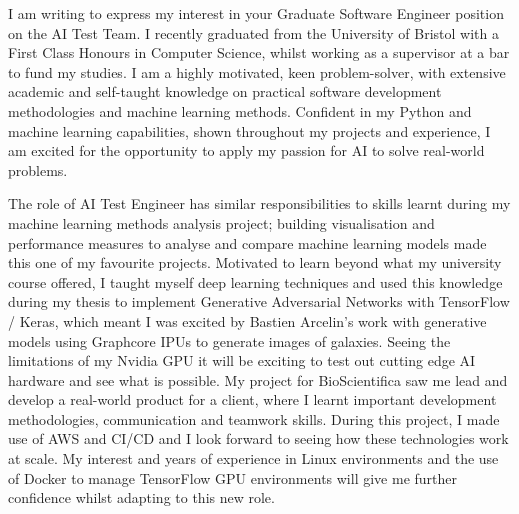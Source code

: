\documentclass[11pt, a4paper]{cv}
\begin{document}
\makecvheader[R]


\makelettertitle


\begin{cvletter}


I am writing to express my interest in your Graduate Software Engineer position on the AI Test Team. I recently graduated from the University of Bristol with a First Class Honours in Computer Science, whilst working as a supervisor at a bar to fund my studies. I am a highly motivated, keen problem-solver, with extensive academic and self-taught knowledge on practical software development methodologies and machine learning methods. Confident in my Python and machine learning capabilities, shown throughout my projects and experience, I am excited for the opportunity to apply my passion for AI to solve real-world problems.

The role of AI Test Engineer has similar responsibilities to skills learnt during my machine learning methods analysis project; building visualisation and performance measures to analyse and compare machine learning models made this one of my favourite projects. Motivated to learn beyond what my university course offered, I taught myself deep learning techniques and used this knowledge during my thesis to implement Generative Adversarial Networks with TensorFlow / Keras, which meant I was excited by Bastien Arcelin's work with generative models using Graphcore IPUs to generate images of galaxies. Seeing the limitations of my Nvidia GPU it will be exciting to test out cutting edge AI hardware and see what is possible. My project for BioScientifica saw me lead and develop a real-world product for a client, where I learnt important development methodologies, communication and teamwork skills. During this project, I made use of AWS and CI/CD and I look forward to seeing how these technologies work at scale. My interest and years of experience in Linux environments and the use of Docker to manage TensorFlow GPU environments will give me further confidence whilst adapting to this new role.


\end{cvletter}
\end{document}
